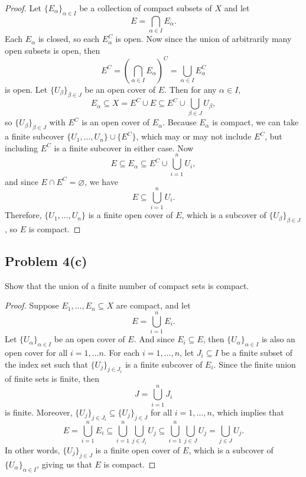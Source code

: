 \documentclass[12pt]{article}
\newenvironment{problem}
    {\begin{lrbox}{\mybox}\begin{minipage}{\textwidth-10pt}}
    {\end{minipage}\end{lrbox}\framebox[6.5in]{\usebox{\mybox}}}
\newcommand{\<}{\left\langle}
\renewcommand{\>}{\right\rangle}
\let\emptyset\varnothing
\begin{document}
\begin{proof}
    Let $\{E_\alpha\}_{\alpha\in I}$ be a collection of compact subsets of $X$ and let
    \[E = \bigcap_{\alpha\in I}E_\alpha.\]
    Each $E_\alpha$ is closed, so each $E_\alpha^C$ is open. Now since the union of arbitrarily many open subsets is open, then
    \[E^C = \left(\bigcap_{\alpha\in I}E_\alpha\right)^C = \bigcup_{\alpha\in I}E_\alpha^C\]
    is open. Let $\{U_\beta\}_{\beta\in J}$ be an open cover of $E$. Then for any $\alpha\in I$,
    \[E_\alpha \subseteq X = E^C \cup E \subseteq E^C \cup \bigcup_{\beta\in J}U_\beta,\]
    so $\{U_\beta\}_{\beta\in J}$ with $E^C$ is an open cover of $E_\alpha$. Because $E_\alpha$ is compact, we can take a finite subcover $\{U_1,\dots,U_n\}\cup\{E^C\}$, which may or may not include $E^C$, but including $E^C$ is a finite subcover in either case. Now
    \[E \subseteq E_\alpha \subseteq E^C\cup\bigcup_{i=1}^nU_i,\]
    and since $E\cap E^C = \emptyset$, we have
    \[E \subseteq \bigcup_{i=1}^nU_i.\]
    Therefore, $\{U_1,\dots,U_n\}$ is a finite open cover of $E$, which is a subcover of $\{U_\beta\}_{\beta\in J}$, so $E$ is compact.
    
\end{proof}

\newpage
\subsection*{Problem 4(c)}
\begin{problem}
    Show that the union of a finite number of compact sets is compact.
\end{problem}

\begin{proof}
    Suppose $E_1,\dots,E_n \subseteq X$ are compact, and let
    \[E = \bigcup_{i=1}^n E_i.\]
    Let $\{U_\alpha\}_{\alpha\in I}$ be an open cover of $E$. And since $E_i\subseteq E$, then $\{U_\alpha\}_{\alpha\in I}$ is also an open cover for all $i=1,\dots n$. For each $i=1,\dots,n$, let $J_i\subseteq I$ be a finite subset of the index set such that $\{U_j\}_{j\in J_i}$ is a finite subcover of $E_i$. Since the finite union of finite sets is finite, then
    \[J = \bigcup_{i=1}^n J_i\]
    is finite. Moreover, $\{U_j\}_{j\in J_i} \subseteq \{U_j\}_{j\in J}$ for all $i=1,\dots,n$, which implies that
    \[E = \bigcup_{i=1}^n E_i \subseteq \bigcup_{i=1}^n\bigcup_{j\in J_i} U_j \subseteq \bigcup_{i=1}^n\bigcup_{j\in J} U_j = \bigcup_{j\in J} U_j.\]
    In other words, $\{U_j\}_{j\in J}$ is a finite open cover of $E$, which is a subcover of $\{U_\alpha\}_{\alpha\in I}$, giving us that $E$ is compact.
    
    
    
\end{proof}
\end{document}
